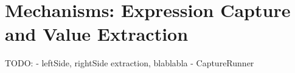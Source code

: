 \section{Mechanisms: Expression Capture and Value Extraction} %



\begin{justify}
TODO:
- leftSide, rightSide extraction, blablabla
- CaptureRunner
\end{justify}






